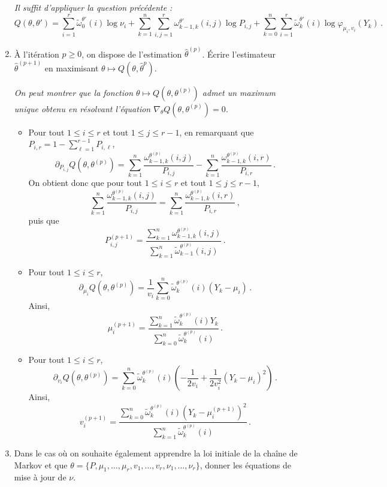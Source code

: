 \documentclass[a4paper,10pt,fleqn]{article}
\newcommand{\1}{\ensuremath{\mathbbm{1}}}
\begin{document}
\begin{enumerate}
\vspace{.2cm}

{\em
Il suffit d'appliquer la question pr\'ec\'edente :
$$
Q(\theta,\theta') =\sum_{i=1}^r\tilde\omega_{0}^{\theta'}(i)\log \nu_i +  \sum_{k=1}^n\sum_{i,j=1}^r\omega_{k-1,k}^{\theta'}(i,j) \log P_{i,j} + \sum_{k=0}^n\sum_{i=1}^r\tilde\omega_{k}^{\theta'}(i)\log \varphi_{\mu_i,v_i}(Y_{k})\,.
$$
}
\item \`A l'it\'eration $p\geq 0$, on dispose de l'estimation $\hat\theta^{(p)}$. \'Ecrire l'estimateur $\hat\theta^{(p+1)}$ en maximisant $\theta\mapsto Q(\theta,\hat\theta^{p})$.%

\vspace{.2cm}

{\em
On peut montrer que la fonction $\theta\mapsto Q(\theta,\theta^{(p)})$ admet un maximum unique obtenu en r\'esolvant l'\'equation $\nabla_\theta Q(\theta,\theta^{(p)}) = 0$.
\begin{itemize}
\item Pour tout $1\leq i \leq r$ et tout $1\leq j \leq r-1$, en remarquant que $ P_{i,r} = 1 - \sum_{\ell=1}^{r-1}P_{i,\ell}$, 
$$
\partial_{P_{i,j}}Q(\theta,\theta^{(p)}) = \sum_{k=1}^n\frac{\omega_{k-1,k}^{\theta^{(p)}}(i,j)}{P_{i,j}} -  \sum_{k=1}^n\frac{\omega_{k-1,k}^{\theta^{(p)}}(i,r)}{P_{i,r}}\,.
$$
On obtient donc que pour tout $1\leq i \leq r$ et tout $1\leq j \leq r-1$,
$$
\sum_{k=1}^n\frac{\omega_{k-1,k}^{\theta^{(p)}}(i,j)}{P_{i,j}} = \sum_{k=1}^n\frac{\omega_{k-1,k}^{\theta^{(p)}}(i,r)}{P_{i,r}}\,,
$$
puis que
$$
P^{(p+1)}_{i,j} =\frac{\sum_{k=1}^n\omega_{k-1,k}^{\theta^{(p)}}(i,j)}{\sum_{k=1}^n\tilde \omega_{k-1}^{\theta^{(p)}}(i,j)}\,.
$$
\item Pour tout $1\leq i \leq r$, 
$$
\partial_{\mu_i}Q(\theta,\theta^{(p)}) = \frac{1}{v_i}\sum_{k=0}^n\tilde\omega_{k}^{\theta^{(p)}}(i)\left(Y_k-\mu_i\right)\,.
$$
Ainsi,
$$
\mu^{(p+1)}_i = \frac{\sum_{k=1}^n\tilde\omega_{k}^{\theta^{(p)}}(i)Y_k}{\sum_{k=0}^n\tilde\omega_{k}^{\theta^{(p)}}(i)}\,.
$$
\item Pour tout $1\leq i \leq r$, 
$$
\partial_{v_i}Q(\theta,\theta^{(p)}) = \sum_{k=0}^n\tilde\omega_{k}^{\theta^{(p)}}(i)\left(-\frac{1}{2v_i} + \frac{1}{2v_i^2}(Y_k-\mu_i)^2\right)\,.
$$
Ainsi,
$$
v^{(p+1)}_i = \frac{\sum_{k=0}^n\tilde\omega_{k}^{\theta^{(p)}}(i)(Y_k-\mu^{(p+1)}_i)^2}{\sum_{k=1}^n\tilde\omega_{k}^{\theta^{(p)}}(i)}\,.
$$
\end{itemize}
}
\item Dans le cas o\`u on souhaite \'egalement apprendre la loi initiale de la cha\^ine de Markov et que $\theta = \{P,\mu_1,\ldots,\mu_r,v_1,\ldots,v_r,\nu_1,\ldots,\nu_r\}$, donner les \'equations de mise \`a jour de $\nu$. 


\end{enumerate}
\end{document}
